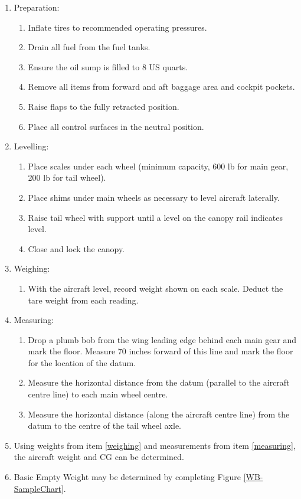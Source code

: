 \begin{enumerate}
  \item Preparation:
    \begin{enumerate}
      \item Inflate tires to recommended operating pressures.
      \item Drain all fuel from the fuel tanks.
      \item Ensure the oil sump is filled to 8 US quarts.
      \item Remove all items from forward and aft baggage area and cockpit pockets.
      \item Raise flaps to the fully retracted position.
      \item Place all control surfaces in the neutral position.
    \end{enumerate}
  \item Levelling:
    \begin{enumerate}
      \item Place scales under each wheel (minimum capacity, 600 lb for main gear, 200 lb for tail wheel).
      \item Place shims under main wheels as necessary to level aircraft laterally.
      \item Raise tail wheel with support until a level on the canopy rail indicates level.
  
   \item Close and lock the canopy.
    \end{enumerate}
  \item Weighing:
  \label{weighing}
    \begin{enumerate}
      \item With the aircraft level, record weight shown on each scale.  Deduct the tare weight from each reading.
    \end{enumerate}
  \item Measuring:
  \label{measuring}
    \begin{enumerate}
      \item Drop a plumb bob from the wing leading edge behind each main gear and mark the floor.  Measure 70 inches
forward of this line and mark the floor for the location of the datum.
      \item Measure the horizontal distance from the datum (parallel to the aircraft centre line) to each main wheel
centre.
      \item Measure the horizontal distance (along the aircraft centre line) from the datum to the centre
of the tail wheel axle.
    \end{enumerate}
  \item Using weights from item \ref{weighing} and measurements from item \ref{measuring}, the aircraft weight and CG
can be determined.\label{calc-wb}
  \item Basic Empty Weight may be determined by completing Figure \ref{WB-SampleChart}.
  \end{enumerate}

